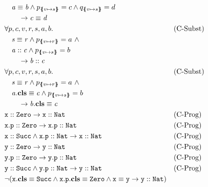 \documentclass[a4paper]{article}
\begin{document}
\begin{align}
  &\quad \pathEq{a}{b} \land
         \subst{p}{v}{s}=c \land \subst{q}{v}{s}=d\\
  &\qquad \rightarrow \pathEq{c}{d}\\
  &\forall p, c, v, r, s, a, b. && \text{(C-Subst)}\\
  &\quad \pathEq{s}{r} \land \subst{p}{v}{r}=a~\land\\
  &\quad \instOf{a}{c} \land
         \subst{p}{v}{s}=b\\
  &\qquad \rightarrow \instOf{b}{c}\\
  &\forall p, c, v, r, s, a, b. && \text{(C-Subst)}\\
  &\quad \pathEq{s}{r} \land \subst{p}{v}{r}=a~\land\\
  &\quad \instBy{a}{c} \land
         \subst{p}{v}{s}=b\\
  &\qquad \rightarrow \instBy{b}{c}\\
  &\instOf{\mathtt{x}}{\Zero} \rightarrow \instOf{\mathtt{x}}{\Nat} && \text{(C-Prog)}\\
  &\instOf{\mathtt{x.p}}{\Zero} \rightarrow \instOf{\mathtt{x.p}}{\Nat} && \text{(C-Prog)}\\
  &\instOf{\mathtt{x}}{\Succ} \land \instOf{\mathtt{x.p}}{\Nat} \rightarrow \instOf{\mathtt{x}}{\Nat} && \text{(C-Prog)}\\
  &\instOf{\mathtt{y}}{\Zero} \rightarrow \instOf{\mathtt{y}}{\Nat} && \text{(C-Prog)}\\
  &\instOf{\mathtt{y.p}}{\Zero} \rightarrow \instOf{\mathtt{y.p}}{\Nat} && \text{(C-Prog)}\\
  &\instOf{\mathtt{y}}{\Succ} \land \instOf{\mathtt{y.p}}{\Nat} \rightarrow \instOf{\mathtt{y}}{\Nat} && \text{(C-Prog)}\\
  &\neg (\instBy{\mathtt{x}}{\Succ} \land \instBy{\mathtt{x.p}}{\Zero} \land \pathEq{\mathtt{x}}{\mathtt{y}} \rightarrow \instOf{\mathtt{y}}{\Nat})
\end{align}
\end{document}
